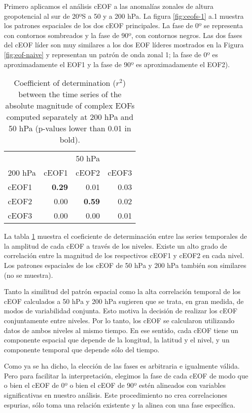 \documentclass[12pt,oneside]{reedthesis}
\begin{document}
Primero aplicamos el análisis cEOF a las anomalías zonales de altura geopotencial al sur de 20ºS a 50 y a 200 hPa.
La figura \ref{fig:ceofs-1} a.1 muestra los patrones espaciales de los dos cEOF principales.
La fase de 0º se representa con contornos sombreados y la fase de 90º, con contornos negros.
Las dos fases del cEOF líder son muy similares a los dos EOF líderes mostrados en la Figura \ref{fig:eof-naive} y representan un patrón de onda zonal 1; la fase de 0º es aproximadamente el EOF1 y la fase de 90º es aproximadamente el EOF2).


\begin{table}

\caption{\label{tab:corr-ceof-splitted}Coefficient of determination (\(r^2\)) between the time series of the absolute magnitude of complex EOFs computed separately at 200 hPa and 50 hPa (p-values lower than 0.01 in bold).}
\centering
\begin{tabular}[t]{l>{}r>{}r>{}r}
\toprule
\multicolumn{1}{c}{} & \multicolumn{3}{c}{50 hPa} \\
\cmidrule(l{3pt}r{3pt}){2-4}
200 hPa & cEOF1 & cEOF2 & cEOF3\\
\midrule
cEOF1 & \textbf{0.29} & 0.01 & 0.03\\
cEOF2 & 0.00 & \textbf{0.59} & 0.02\\
cEOF3 & 0.00 & 0.00 & 0.01\\
\bottomrule
\end{tabular}
\end{table}
La tabla \ref{tab:corr-ceof-splitted} muestra el coeficiente de determinación entre las series temporales de la amplitud de cada cEOF a través de los niveles.
Existe un alto grado de correlación entre la magnitud de los respectivos cEOF1 y cEOF2 en cada nivel.
Los patrones espaciales de los cEOF de 50 hPa y 200 hPa también son similares (no se muestra).

Tanto la similitud del patrón espacial como la alta correlación temporal de los cEOF calculados a 50 hPa y 200 hPa sugieren que se trata, en gran medida, de modos de variabilidad conjunta.
Esto motiva la decisión de realizar los cEOF conjuntamente entre niveles.
Por lo tanto, los cEOF se calcularon utilizando datos de ambos niveles al mismo tiempo.
En ese sentido, cada cEOF tiene un componente espacial que depende de la longitud, la latitud y el nivel, y un componente temporal que depende sólo del tiempo.

Como ya se ha dicho, la elección de las fases es arbitraria e igualmente válida.
Pero para facilitar la interpretación, elegimos la fase de cada cEOF de modo que o bien el cEOF de 0º o bien el cEOF de 90º estén alineados con variables significativas en nuestro análisis.
Este procedimiento no crea correlaciones espurias, sólo toma una relación existente y la alinea con una fase específica.
\end{document}
